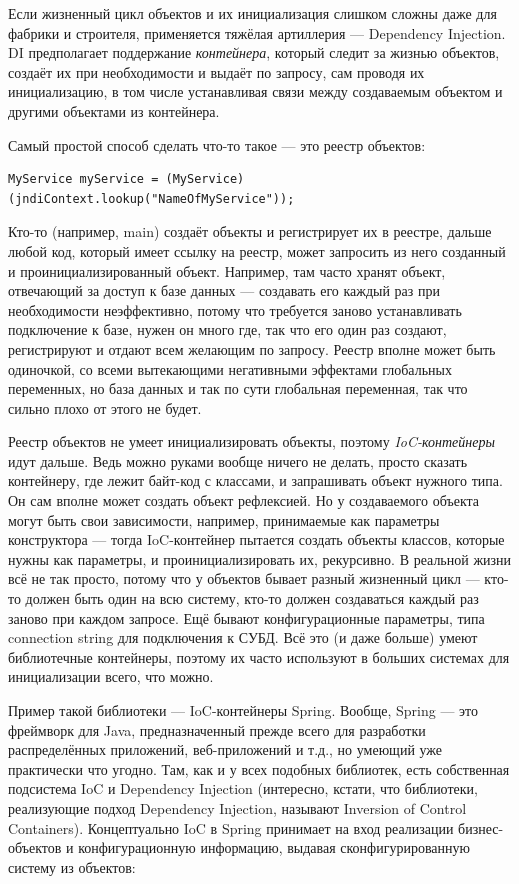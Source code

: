 \documentclass[a5paper]{article}
\begin{document}
Если жизненный цикл объектов и их инициализация слишком сложны даже для фабрики и строителя, применяется тяжёлая артиллерия --- Dependency Injection. DI предполагает поддержание \textit{контейнера}, который следит за жизнью объектов, создаёт их при необходимости и выдаёт по запросу, сам проводя их инициализацию, в том числе устанавливая связи между создаваемым объектом и другими объектами из контейнера.

Самый простой способ сделать что-то такое --- это реестр объектов:

\begin{verbatim}
MyService myService = (MyService)(jndiContext.lookup("NameOfMyService"));
\end{verbatim}

Кто-то (например, main) создаёт объекты и регистрирует их в реестре, дальше любой код, который имеет ссылку на реестр, может запросить из него созданный и проинициализированный объект. Например, там часто хранят объект, отвечающий за доступ к базе данных --- создавать его каждый раз при необходимости неэффективно, потому что требуется заново устанавливать подключение к базе, нужен он много где, так что его один раз создают, регистрируют и отдают всем желающим по запросу. Реестр вполне может быть одиночкой, со всеми вытекающими негативными эффектами глобальных переменных, но база данных и так по сути глобальная переменная, так что сильно плохо от этого не будет.

Реестр объектов не умеет инициализировать объекты, поэтому \textit{IoC-контейнеры} идут дальше. Ведь можно руками вообще ничего не делать, просто сказать контейнеру, где лежит байт-код с классами, и запрашивать объект нужного типа. Он сам вполне может создать объект рефлексией. Но у создаваемого объекта могут быть свои зависимости, например, принимаемые как параметры конструктора --- тогда IoC-контейнер пытается создать объекты классов, которые нужны как параметры, и проинициализировать их, рекурсивно. В реальной жизни всё не так просто, потому что у объектов бывает разный жизненный цикл --- кто-то должен быть один на всю систему, кто-то должен создаваться каждый раз заново при каждом запросе. Ещё бывают конфигурационные параметры, типа connection string для подключения к СУБД. Всё это (и даже больше) умеют библиотечные контейнеры, поэтому их часто используют в больших системах для инициализации всего, что можно.

Пример такой библиотеки --- IoC-контейнеры Spring. Вообще, Spring --- это фреймворк для Java, предназначенный прежде всего для разработки распределённых приложений, веб-приложений и т.д., но умеющий уже практически что угодно. Там, как и у всех подобных библиотек, есть собственная подсистема IoC и Dependency Injection (интересно, кстати, что библиотеки, реализующие подход Dependency Injection, называют Inversion of Control Containers). Концептуально IoC в Spring принимает на вход реализации бизнес-объектов и конфигурационную информацию, выдавая сконфигурированную систему из объектов:
\end{document}
